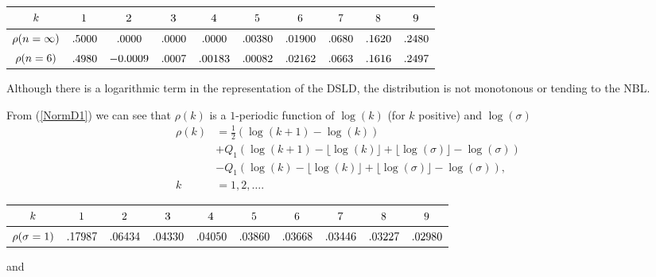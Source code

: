 \documentclass[titlepage,fleqn]{article}%
\begin{document}
\begin{tabular}
[c]{|c|c|c|c|c|c|c|c|c|c|}\hline\hline
${\small k}$ & ${\small 1}$ & ${\small 2}$ & ${\small 3}$ & ${\small 4}$ &
${\small 5}$ & ${\small 6}$ & ${\small 7}$ & ${\small 8}$ & ${\small 9}%
$\\\hline
${\small \rho(n=\infty)}$ & ${\small .5000}$ & ${\small .0000}$ &
${\small .0000}$ & ${\small .0000}$ & ${\small .00380}$ & ${\small .01900}$ &
${\small .0680}$ & ${\small .1620}$ & ${\small .2480}$\\\hline
${\small \rho(n=6)}$ & ${\small .4980}$ & ${\small -0.0009}$ & ${\small .0007}%
$ & ${\small .00183}$ & ${\small .00082}$ & ${\small .02162}$ &
${\small .0663}$ & ${\small .1616}$ & ${\small .2497}$\\\hline\hline
\end{tabular}


\bigskip

Although there is a logarithmic term in the representation of the DSLD, the
distribution is not monotonous or tending to the NBL.

From (\ref{NormD1}) we can see that $\rho(k)$ is a $1$-periodic function of
$\log(k)$ (for $k$ positive) and $\log(\sigma)$%
\begin{align}
\rho(k)  &  =\frac{1}{2}\left(  \log(k+1)-\log(k)\right) \label{NormD2}\\
&  +Q_{1}(\log(k+1)-\lfloor\log(k)\rfloor+\lfloor\log(\sigma)\rfloor
-\log(\sigma))\nonumber\\
&  -Q_{1}(\log(k)-\lfloor\log(k)\rfloor+\lfloor\log(\sigma)\rfloor-\log
(\sigma)),\nonumber\\
k  &  =1,2,\ldots.\nonumber
\end{align}
%

\begin{tabular}
[c]{|c|c|c|c|c|c|c|c|c|c|}\hline\hline
${\small k}$ & ${\small 1}$ & ${\small 2}$ & ${\small 3}$ & ${\small 4}$ &
${\small 5}$ & ${\small 6}$ & ${\small 7}$ & ${\small 8}$ & ${\small 9}%
$\\\hline
${\small \rho(\sigma=1)}$ & ${\small .17987}$ & ${\small .06434}$ &
${\small .04330}$ & ${\small .04050}$ & ${\small .03860}$ & ${\small .03668}$
& ${\small .03446}$ & ${\small .03227}$ & ${\small .02980}$\\\hline\hline
\end{tabular}


\bigskip

\noindent and
\end{document}
